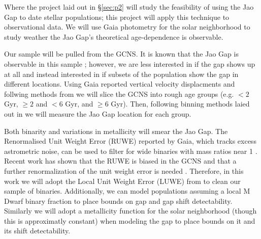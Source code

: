 Where the project laid out in \S \ref{sec:p2} will study the feasibility of
using the Jao Gap to date stellar populations; this project will apply this
technique to observational data. We will use Gaia photometry for the solar
neighborhood to study weather the Jao Gap's theoretical age-dependence is
observable.

Our sample will be pulled from the GCNS. It is known that the Jao Gap is
observable in this sample \citep[Figure 17 in][]{GaiaCollaboration2021};
however, we are less interested in if the gap shows up at all and instead
interested in if subsets of the population show the gap in different locations.
Using Gaia reported vertical velocity displacments and follwing methods from
\citep{Lu2021}  we will slice the GCNS into rough age groups (e.g. $< 2$ Gyr, $\geq
2$ and $< 6$ Gyr, and $\geq 6$ Gyr). Then, following binning methods laied
out in \citet{Jao2018} we will measure the Jao Gap location for each group.

Both binarity and variations in metallicity will smear the Jao Gap. The
Renormalised Unit Weight Error (RUWE) reported by Gaia, which tracks excess
astrometric noise, can be used to filter for wide binaries with mass ratios
near 1 \citep[e.g.][]{Deacon2020, Kervella2022}. Recent work has shown that the
RUWE is biased in the GCNS and that a further renormalization of the unit
weight error is needed \citep{Penoyre2022}. Therefore, in this work we will
adopt the Local Unit Weight Error (LUWE) from \citet{Penoyre2022} to clean our
sample of binaries. Additionally, we can model populations assuming a local M
Dwarf binary fraction \citep{Winters2019} to place bounds on gap and gap shift
detectability. Similarly we will adopt a metallicity function for the solar
neighborhood (though this is approximatly constant) \citep{Holmberg2009} when
modeling the gap to place bounds on it and its shift detectability.
